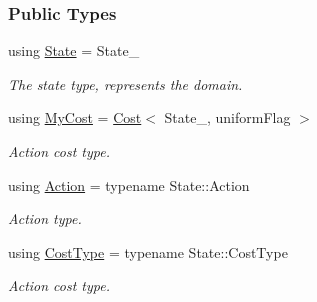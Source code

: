\subsubsection*{Public Types}
\begin{DoxyCompactItemize}
\item 
using \hyperlink{structActionNeighbor_a0101b08dc663ea7c1f0fac1de10b5ed5}{State} = State\+\_\+\hypertarget{structActionNeighbor_a0101b08dc663ea7c1f0fac1de10b5ed5}{}\label{structActionNeighbor_a0101b08dc663ea7c1f0fac1de10b5ed5}

\begin{DoxyCompactList}\small\item\em The state type, represents the domain. \end{DoxyCompactList}\item 
using \hyperlink{structActionNeighbor_a1ac13b278fe6631f40af5fa4da580495}{My\+Cost} = \hyperlink{structCost}{Cost}$<$ State\+\_\+, uniform\+Flag $>$\hypertarget{structActionNeighbor_a1ac13b278fe6631f40af5fa4da580495}{}\label{structActionNeighbor_a1ac13b278fe6631f40af5fa4da580495}

\begin{DoxyCompactList}\small\item\em Action cost type. \end{DoxyCompactList}\item 
using \hyperlink{structActionNeighbor_addfe8c4e48dfb6b7470701c68cb33a07}{Action} = typename State\+::\+Action\hypertarget{structActionNeighbor_addfe8c4e48dfb6b7470701c68cb33a07}{}\label{structActionNeighbor_addfe8c4e48dfb6b7470701c68cb33a07}

\begin{DoxyCompactList}\small\item\em Action type. \end{DoxyCompactList}\item 
using \hyperlink{structActionNeighbor_a0eb38c22f9f38a82eeba97c9801b1fd5}{Cost\+Type} = typename State\+::\+Cost\+Type\hypertarget{structActionNeighbor_a0eb38c22f9f38a82eeba97c9801b1fd5}{}\label{structActionNeighbor_a0eb38c22f9f38a82eeba97c9801b1fd5}

\begin{DoxyCompactList}\small\item\em Action cost type. \end{DoxyCompactList}\end{DoxyCompactItemize}
